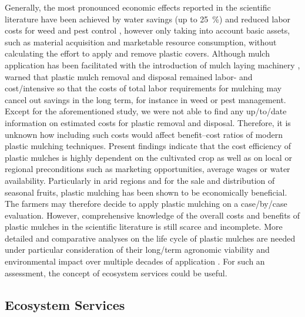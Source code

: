 Generally, the most pronounced economic effects reported in the scientific literature have been achieved by water savings (up to \SI{25}{\percent}) and reduced labor costs for weed and pest control \citep{IngmanAgricultural2015,JabranMulching2015}, however only taking into account basic assets, such as material acquisition and marketable resource consumption, without calculating the effort to apply and remove plastic covers.
Although mulch application has been facilitated with the introduction of mulch laying machinery \citep{SinghMechanization2014}, \citet{SchonbeckWeed1999} warned that plastic mulch removal and disposal remained labor- and cost\-/intensive so that the costs of total labor requirements for mulching may cancel out savings in the long term, for instance in weed or pest management. Except for the aforementioned study, we were not able to find any up\-/to\-/date information on estimated costs for plastic removal and disposal. Therefore, it is unknown how including such costs would affect benefit--cost ratios of modern plastic mulching techniques.
Present findings indicate that the cost efficiency of plastic mulches is highly dependent on the cultivated crop as well as on local or regional preconditions such as marketing opportunities, average wages or water availability. Particularly in arid regions and for the sale and distribution of seasonal fruits, plastic mulching has been shown to be economically beneficial. The farmers may therefore decide to apply plastic mulching on a case\-/by\-/case evaluation. However, comprehensive knowledge of the overall costs and benefits of plastic mulches in the scientific literature is still scarce and incomplete. More detailed and comparative analyses on the life cycle of plastic mulches are needed under particular consideration of their long\-/term agronomic viability and environmental impact over multiple decades of application \citep{AyalaPerspectives2002}. For such an assessment, the concept of ecosystem services could be useful.

\subsection{Ecosystem Services}

